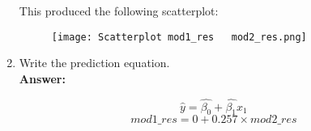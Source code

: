 \documentclass[12pt,letterpaper]{article}
\begin{document}
\begin{enumerate}
		This produced the following scatterplot:
		
		\begin{figure}[H]\centering
			\caption{\footnotesize}
			\texttt{[image: Scatterplot mod1\_res ~ mod2\_res.png]}
		\end{figure} 
		
		\item Write the prediction equation.\\
		
		
		\textbf{Answer:}
		
		\[\hat{y} = \hat{\beta_0} + \hat{\beta_1}x_1 \]
		\[mod1\_res = 0 + 0.257\times mod2\_res \]
		
	\end{enumerate}
	
	\newpage	
\end{document}
